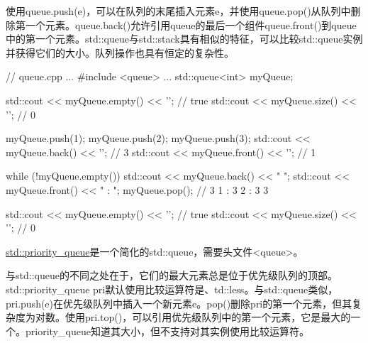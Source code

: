使用queue.push(e)，可以在队列的末尾插入元素e，并使用queue.pop()从队列中删除第一个元素。queue.back()允许引用queue的最后一个组件queue.front()到queue中的第一个元素。std::queue与std::stack具有相似的特征，可以比较std::queue实例并获得它们的大小。队列操作也具有恒定的复杂性。


\begin{cpp}
// queue.cpp
...
#include <queue>
...
std::queue<int> myQueue;

std::cout << myQueue.empty() << '\n'; // true
std::cout << myQueue.size() << '\n'; // 0

myQueue.push(1);
myQueue.push(2);
myQueue.push(3);
std::cout << myQueue.back() << '\n'; // 3
std::cout << myQueue.front() << '\n'; // 1

while (!myQueue.empty()){
	std::cout << myQueue.back() << " ";
	std::cout << myQueue.front() << " : ";
	myQueue.pop();
} // 3 1 : 3 2 : 3 3
	
std::cout << myQueue.empty() << '\n'; // true
std::cout << myQueue.size() << '\n'; // 0
\end{cpp}




\href{http://en.cppreference.com/w/cpp/container/priority_queue}{std::priority\_queue}是一个简化的std::queue，需要头文件<queue>。

与std::queue的不同之处在于，它们的最大元素总是位于优先级队列的顶部。std::priority\_queue pri默认使用比较运算符是、td::less。与std::queue类似，pri.push(e)在优先级队列中插入一个新元素e。pop()删除pri的第一个元素，但其复杂度为对数。使用pri.top()，可以引用优先级队列中的第一个元素，它是最大的一个。priority\_queue知道其大小，但不支持对其实例使用比较运算符。


